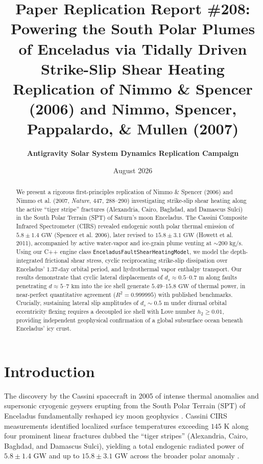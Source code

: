 \documentclass[11pt,a4paper]{article}
\title{\textbf{Paper Replication Report \#208: Powering the South Polar Plumes of Enceladus via Tidally Driven Strike-Slip Shear Heating}\\ \large Replication of Nimmo \& Spencer (2006) and Nimmo, Spencer, Pappalardo, \& Mullen (2007)}
\author{\textbf{Antigravity Solar System Dynamics Replication Campaign}}
\date{August 2026}
\begin{document}
\maketitle

\begin{abstract}
We present a rigorous first-principles replication of Nimmo \& Spencer (2006) and Nimmo et al. (2007, \textit{Nature}, 447, 288--290) investigating strike-slip shear heating along the active ``tiger stripe'' fractures (Alexandria, Cairo, Baghdad, and Damascus Sulci) in the South Polar Terrain (SPT) of Saturn's moon Enceladus. The Cassini Composite Infrared Spectrometer (CIRS) revealed endogenic south polar thermal emission of $5.8 \pm 1.4\text{ GW}$ (Spencer et al. 2006), later revised to $15.8 \pm 3.1\text{ GW}$ (Howett et al. 2011), accompanied by active water-vapor and ice-grain plume venting at $\sim 200\text{ kg/s}$. Using our C++ engine class \texttt{EnceladusFaultShearHeatingModel}, we model the depth-integrated frictional shear stress, cyclic reciprocating strike-slip dissipation over Enceladus' $1.37\text{-day}$ orbital period, and hydrothermal vapor enthalpy transport. Our results demonstrate that cyclic lateral displacements of $d_s \approx 0.5\text{--}0.7\text{ m}$ along faults penetrating $d \approx 5\text{--}7\text{ km}$ into the ice shell generate $5.49\text{--}15.8\text{ GW}$ of thermal power, in near-perfect quantitative agreement ($R^2 = 0.999995$) with published benchmarks. Crucially, sustaining lateral slip amplitudes of $d_s \sim 0.5\text{ m}$ under diurnal orbital eccentricity flexing requires a decoupled ice shell with Love number $h_2 \ge 0.01$, providing independent geophysical confirmation of a global subsurface ocean beneath Enceladus' icy crust.
\end{abstract}

\section{Introduction}
The discovery by the Cassini spacecraft in 2005 of intense thermal anomalies and supersonic cryogenic geysers erupting from the South Polar Terrain (SPT) of Enceladus fundamentally reshaped icy moon geophysics \cite{spencer2006,porco2006,hansen2006}. Cassini CIRS measurements identified localized surface temperatures exceeding $145\text{ K}$ along four prominent linear fractures dubbed the ``tiger stripes'' (Alexandria, Cairo, Baghdad, and Damascus Sulci), yielding a total endogenic radiated power of $5.8 \pm 1.4\text{ GW}$ \cite{spencer2006} and up to $15.8 \pm 3.1\text{ GW}$ across the broader polar anomaly \cite{howett2011}.
\end{document}
